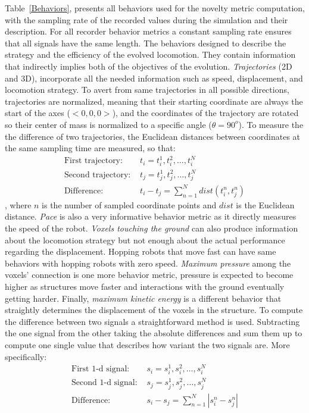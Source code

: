Table~\ref{Behaviors}, presents all behaviors used for the novelty metric computation, with the sampling rate of the recorded values during the simulation and their description. For all recorder behavior metrics a constant sampling rate ensures that all signals have the same length. The behaviors designed to describe the strategy and the efficiency of the evolved  locomotion. They contain information that indirectly implies both of the objectives of the evolution. \emph{Trajectories} (2D and 3D), incorporate all the needed information such as speed, displacement, and locomotion strategy. To avert from same trajectories in all possible directions, trajectories are normalized, meaning that their starting coordinate are always the start of the axes ($<0,0,0>$), and the coordinates of the trajectory are rotated so their center of mass is normalized to a specific angle ($\theta = 90^{o}$). To measure the the difference of two trajectories, the Euclidean distances between coordinates at the same sampling time are measured, so that:
\begin{align}
\text{First trajectory: } &t_i = t_i^1, t_i^2, \ldots, t_i^N\\
\text{Second trajectory: } &t_j = t_j^1, t_j^2, \ldots, t_j^N\\
\text{Difference: } &t_i - t_j = \sum_{n=1}^{N} dist( t_i^n, t_j^n )
\end{align}
, where $n$ is the number of sampled coordinate points and $dist$ is the Euclidean distance. \emph{Pace} is also a very informative behavior metric as it directly measures the speed of the robot. \emph{Voxels touching the ground} can also produce information about the locomotion strategy but not enough about the actual performance regarding the displacement. Hopping robots that move fast can have same behaviors with hopping robots with zero speed. \emph{Maximum pressure} among the voxels' connection is one more behavior metric, pressure is expected to become higher as structures move faster and interactions with the ground eventually getting harder. Finally, \emph{maximum kinetic energy} is a different behavior that straightly determines the displacement of the voxels in the structure. To compute the difference between two signals a straightforward method is used. Subtracting the one signal from the other taking the absolute differences and sum them up to compute one single value that describes how variant the two signals are. More specifically:
\begin{align}
\text{First 1-d signal: } &s_i = s_i^1, s_i^2, \ldots, s_i^N\\
\text{Second 1-d signal: } &s_j = s_j^1, s_j^2, \ldots, s_j^N\\
\text{Difference: } &s_i - s_j = \sum_{n=1}^{N} | s_i^n - s_j^n |
\end{align}

